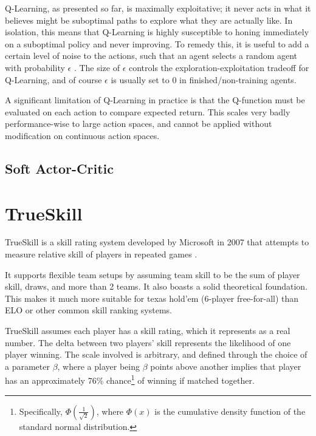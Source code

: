 Q-Learning, as presented so far, is maximally exploitative; it never acts in what it believes might be suboptimal paths to explore what they are actually like. In isolation, this means that Q-Learning is highly susceptible to honing immediately on a suboptimal policy and never improving. To remedy this, it is useful to add a certain level of noise to the actions, such that an agent selects a random agent with probability $\epsilon$ \cite[Chapters 2.2 \& 2.3]{Sutton}. The size of $\epsilon$ controls the exploration-exploitation tradeoff for Q-Learning, and of course $\epsilon$ is usually set to 0 in finished/non-training agents.

A significant limitation of Q-Learning in practice is that the Q-function must be evaluated on each action to compare expected return. This scales very badly performance-wise to large action spaces, and cannot be applied without modification on continuous action spaces.



\subsection{Soft Actor-Critic}


\section{TrueSkill}

TrueSkill is a skill rating system developed by Microsoft in 2007 that attempts to measure relative skill of players in repeated games \cite{TrueSkill_original} \cite{TrueSkill_blog}.

It supports flexible team setups by assuming team skill to be the sum of player skill, draws, and more than 2 teams. It also boasts a solid theoretical foundation. This makes it much more suitable for texas hold'em (6-player free-for-all) than ELO  or other common skill ranking systems.

TrueSkill assumes each player has a skill rating, which it represents as a real number. The delta between two players' skill represents the likelihood of one player winning. The scale involved is arbitrary, and defined through the choice of a parameter $\beta$, where a player being $\beta$ points above another implies that player has an approximately 76\% chance\footnote{Specifically, $\Phi\left(\frac{1}{\sqrt{2}}\right)$, where $\Phi(x)$ is the cumulative density function of the standard normal distribution.} of winning if matched together.


